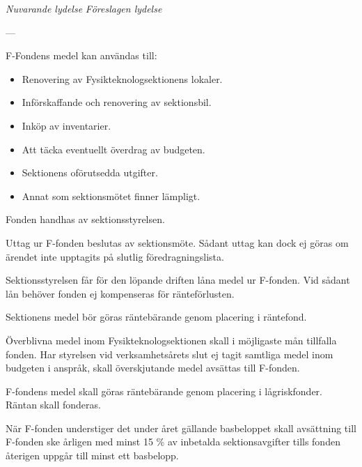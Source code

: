 \documentclass{article}
\newenvironment{lydelse}
    {\begin{paracol}{2}%
        \emph{Nuvarande lydelse}%
        \switchcolumn%
        \emph{Föreslagen lydelse}%
    \end{paracol}%
    \begin{enumerate}[label=\thesubsection.\arabic*]%
    \begin{paracol}{2}%
    }{\end{paracol}\end{enumerate}}
\begin{document}
\begin{lydelse}
    
    \setcounter{subsection}{2}
    
    \item[] ---
    
    
    \vspace{1.3em}\setcounter{enumi}{1}
    \item F-Fondens medel kan användas till:
	\begin{itemize}
		\item Renovering av Fysikteknologsektionens lokaler.
		\item Införskaffande och renovering av sektionsbil.
		\item Inköp av inventarier.
		\item Att täcka eventuellt överdrag av budgeten.
		\item Sektionens oförutsedda utgifter.
		\item Annat som sektionsmötet finner lämpligt.
	\end{itemize}
	
	
	\item Fonden handhas av sektionsstyrelsen.
	
    \item Uttag ur F-fonden beslutas av sektionsmöte. Sådant uttag kan dock ej göras om ärendet inte upptagits på slutlig föredragningslista.
    
    \item Sektionsstyrelsen får för den löpande driften låna medel ur F-fonden. Vid sådant lån behöver fonden ej kompenseras för ränteförlusten.
    
    \setcounter{enumi}{0}
    \item Sektionens medel bör göras räntebärande genom placering i räntefond.
    
    \setcounter{enumi}{5}
    \item Överblivna medel inom Fysikteknologsektionen skall i möjligaste mån tillfalla fonden. Har styrelsen vid verksamhetsårets slut ej tagit samtliga medel inom budgeten i anspråk, skall överskjutande medel avsättas till F-fonden.
    
    \item F-fondens medel skall göras räntebärande genom placering i lågriskfonder. Räntan skall fonderas.
    
    \item När F-fonden understiger det under året gällande basbeloppet skall avsättning till F-fonden ske årligen med minst 15 \% av inbetalda sektionsavgifter tills fonden återigen uppgår till minst ett basbelopp.


\end{lydelse}
\end{document}
